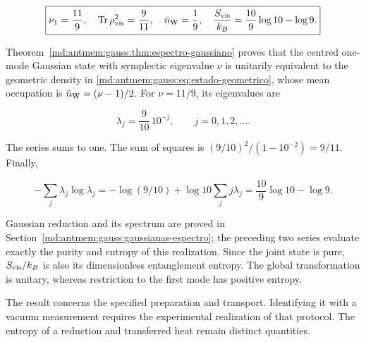 \begin{equation}
\boxed{\nu_1=\frac{11}{9},\quad
\operatorname{Tr}\rho_{\rm vis}^2=\frac9{11},\quad
\bar n_{\rm W}=\frac19,\quad
\frac{S_{\rm vis}}{k_B}=\frac{10}{9}\log10-\log9.}
\label{md:antmem:cuantica:eq:5.9}
\end{equation}

Theorem~\ref{md:antmem:gauss:thm:espectro-gaussiano} proves that the centred one-mode Gaussian state with symplectic eigenvalue \(\nu\) is unitarily equivalent to the geometric density in \eqref{md:antmem:gauss:eq:estado-geometrico}, whose mean occupation is \(\bar n_{\rm W}=(\nu-1)/2\). For \(\nu=11/9\), its eigenvalues are

\begin{equation}
\lambda_j=\frac9{10}\,10^{-j},\qquad j=0,1,2,\ldots.
\label{md:antmem:cuantica:eq:5.10}
\end{equation}

The series sums to one. The sum of squares is
\((9/10)^2/(1-10^{-2})=9/11\). Finally,

\[
-\sum_j\lambda_j\log\lambda_j
=-\log(9/10)+\log10\sum_jj\lambda_j
=\frac{10}{9}\log10-\log9.
\]

Gaussian reduction and its spectrum are proved in Section~\ref{md:antmem:gauss:gaussianas-espectro}; the preceding two series evaluate exactly the purity and entropy of this realization. Since the joint state is pure, \(S_{\rm vis}/k_B\) is also its dimensionless entanglement entropy. The global transformation is unitary, whereas restriction to the first mode has positive entropy.

The result concerns the specified preparation and transport. Identifying it with a vacuum measurement requires the experimental realization of that protocol. The entropy of a reduction and transferred heat remain distinct quantities.
